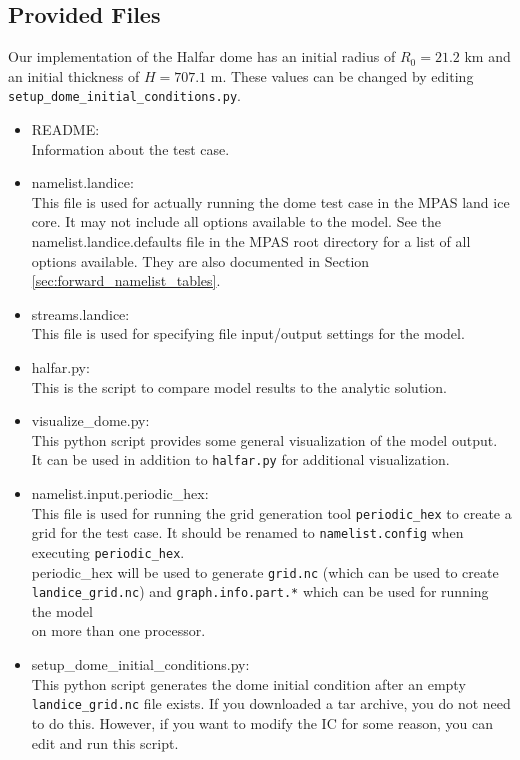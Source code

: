 \subsection{Provided Files}
\label{subsec:halfar_files}
Our implementation of the Halfar dome has an initial radius of $R_0=21.2$ km and an initial thickness of $H=707.1$ m.
These values can be changed by editing \texttt{setup\_dome\_initial\_conditions.py}.

\begin{itemize}
	\item README: \\
		Information about the test case.

	\item namelist.landice: \\
		This file is used for actually running the dome test case in the MPAS land ice core.  It may not include all options available to the model.  See the namelist.landice.defaults file in the MPAS root directory for a list of all options available.  They are also documented in Section \ref{sec:forward_namelist_tables}.

	\item streams.landice: \\
		This file is used for specifying file input/output settings for the model.

	\item halfar.py: \\
		This is the script to compare model results to the analytic solution.

	\item visualize\_dome.py: \\
		This python script provides some general visualization of the model output.
		It can be used in addition to \texttt{halfar.py} for additional visualization.

	\item namelist.input.periodic\_hex: \\
		This file is used for running the grid generation tool \texttt{periodic\_hex} to create a grid for the test case.
		It should be renamed to \texttt{namelist.config} when executing \texttt{periodic\_hex}. \\
		periodic\_hex will be used to generate \texttt{grid.nc} (which can be used to create \\
		\texttt{landice\_grid.nc}) and \texttt{graph.info.part.*} which can be used for running the model \\
		on more than one processor.
	\item setup\_dome\_initial\_conditions.py: \\
		This python script generates the dome initial condition after an empty \texttt{landice\_grid.nc} file exists.  If you downloaded a tar archive, you do not need to do this.  However, if you want to modify the IC for some reason, you can edit and run this script.
\end{itemize}

